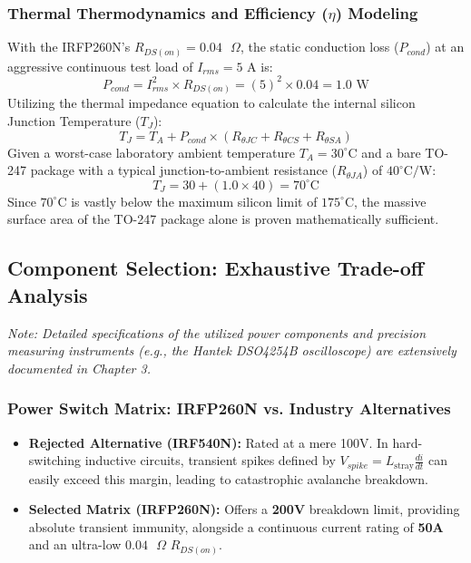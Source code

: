 \subsubsection{Thermal Thermodynamics and Efficiency ($\eta$) Modeling}
With the IRFP260N's $R_{DS(on)} = 0.04\text{ }\Omega$, the static conduction loss ($P_{cond}$) at an aggressive continuous test load of $I_{rms} = 5\text{ A}$ is:
\begin{equation}
    P_{cond} = I_{rms}^2 \times R_{DS(on)} = (5)^2 \times 0.04 = 1.0\text{ W}
    \label{eq:p_cond}
\end{equation}
Utilizing the thermal impedance equation to calculate the internal silicon Junction Temperature ($T_J$):
\begin{equation}
    T_J = T_A + P_{cond} \times (R_{\theta JC} + R_{\theta CS} + R_{\theta SA})
    \label{eq:t_junction_formula}
\end{equation}
Given a worst-case laboratory ambient temperature $T_A = 30^\circ\text{C}$ and a bare TO-247 package with a typical junction-to-ambient resistance ($R_{\theta JA}$) of $40^\circ\text{C/W}$:
\begin{equation}
    T_J = 30 + (1.0 \times 40) = 70^\circ\text{C}
    \label{eq:t_junction_result}
\end{equation}
Since $70^\circ\text{C}$ is vastly below the maximum silicon limit of $175^\circ\text{C}$, the massive surface area of the TO-247 package alone is proven mathematically sufficient.

\subsection{Component Selection: Exhaustive Trade-off Analysis}

\textit{Note: Detailed specifications of the utilized power components and precision measuring instruments (e.g., the Hantek DSO4254B oscilloscope) are extensively documented in Chapter 3.}

\subsubsection{Power Switch Matrix: IRFP260N vs. Industry Alternatives}
\begin{itemize}
    \item \textbf{Rejected Alternative (IRF540N):} Rated at a mere 100V. In hard-switching inductive circuits, transient spikes defined by $V_{spike} = L_{\text{stray}} \frac{di}{dt}$ can easily exceed this margin, leading to catastrophic avalanche breakdown.
    \item \textbf{Selected Matrix (IRFP260N):} Offers a \textbf{200V} breakdown limit, providing absolute transient immunity, alongside a continuous current rating of \textbf{50A} and an ultra-low $0.04\text{ }\Omega$ $R_{DS(on)}$.
\end{itemize}

